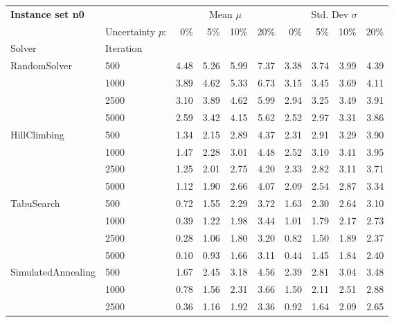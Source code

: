 \vspace*{-25px}
\begin{figure}[H]
\end{figure}


{\footnotesize
\begin{longtable}{ll|rrrr|rrrr}
\toprule
\textbf{Instance set n0}                 & {} & \multicolumn{4}{c|}{Mean $\mu$} & \multicolumn{4}{c}{Std. Dev $\sigma$} \\
                & Uncertainty $p$: & 0\% & 5\% & 10\% & 20\% & 0\% & 5\% & 10\% & 20\% \\
Solver & Iteration &      &      &      &      &      &      &      &      \\
\midrule
RandomSolver & 500  & 4.48 & 5.26 & 5.99 & 7.37 & 3.38 & 3.74 & 3.99 & 4.39 \\
                 & 1000 & 3.89 & 4.62 & 5.33 & 6.73 & 3.15 & 3.45 & 3.69 & 4.11 \\
                 & 2500 & 3.10 & 3.89 & 4.62 & 5.99 & 2.94 & 3.25 & 3.49 & 3.91 \\
                 & 5000 & 2.59 & 3.42 & 4.15 & 5.62 & 2.52 & 2.97 & 3.31 & 3.86 \\ \hline
HillClimbing & 500  & 1.34 & 2.15 & 2.89 & 4.37 & 2.31 & 2.91 & 3.29 & 3.90 \\
                 & 1000 & 1.47 & 2.28 & 3.01 & 4.48 & 2.52 & 3.10 & 3.41 & 3.95 \\
                 & 2500 & 1.25 & 2.01 & 2.75 & 4.20 & 2.33 & 2.82 & 3.11 & 3.71 \\
                 & 5000 & 1.12 & 1.90 & 2.66 & 4.07 & 2.09 & 2.54 & 2.87 & 3.34 \\ \hline
TabuSearch & 500  & 0.72 & 1.55 & 2.29 & 3.72 & 1.63 & 2.30 & 2.64 & 3.10 \\
                 & 1000 & 0.39 & 1.22 & 1.98 & 3.44 & 1.01 & 1.79 & 2.17 & 2.73 \\
                 & 2500 & 0.28 & 1.06 & 1.80 & 3.20 & 0.82 & 1.50 & 1.89 & 2.37 \\
                 & 5000 & 0.10 & 0.93 & 1.66 & 3.11 & 0.44 & 1.45 & 1.84 & 2.40 \\ \hline
SimulatedAnnealing & 500  & 1.67 & 2.45 & 3.18 & 4.56 & 2.39 & 2.81 & 3.04 & 3.48 \\
                 & 1000 & 0.78 & 1.56 & 2.31 & 3.66 & 1.50 & 2.11 & 2.51 & 2.88 \\
                 & 2500 & 0.36 & 1.16 & 1.92 & 3.36 & 0.92 & 1.64 & 2.09 & 2.65 \\

\end{longtable}}
